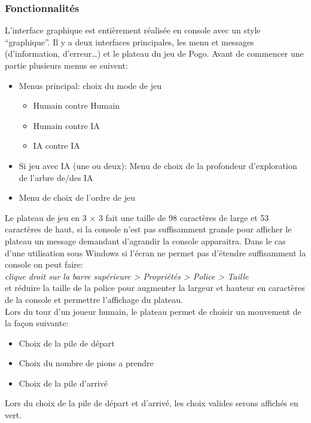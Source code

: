 \documentclass[article, backcover, french, nodocumentinfo]{upmethodology-document}
\begin{document}
			\subsubsection{Fonctionnalités}
				L'interface graphique est entièrement réalisée en console avec un style ``graphique''. Il y a deux interfaces principales, les menu et messages (d'information, d'erreur\ldots) et le plateau du jeu de Pogo.
					Avant de commencer une partie plusieurs menus se suivent:
					\begin{itemize}
						\item Menus principal: choix du mode de jeu
							\begin{itemize}
								\item Humain contre Humain
								\item Humain contre IA
								\item IA contre IA
							\end{itemize}
						\item Si jeu avec IA (une ou deux): Menu de choix de la profondeur d'exploration de l'arbre de/des IA
						\item Menu de choix de l'ordre de jeu
					\end{itemize}
					Le plateau de jeu en 3 $\times$ 3 fait une taille de 98 caractères de large et 53 caractères de haut, si la console n'est pas suffisamment grande pour afficher le plateau un message demandant d'agrandir la console apparaitra. Dans le cas d'une utilisation sous Windows si l'écran ne permet pas d'étendre suffisamment la console on peut faire:\\
					\textit{clique droit sur la barre supérieure > Propriétés > Police > Taille}\\
					et réduire la taille de la police pour augmenter la largeur et hauteur en caractères de la console et permettre l'affichage du plateau.\\

					Lors du tour d'un joueur humain, le plateau permet de choisir un mouvement de la façon suivante:
					\begin{itemize}
						\item Choix de la pile de départ
						\item Choix du nombre de pions a prendre
						\item Choix de la pile d'arrivé
					\end{itemize}
					Lors du choix de la pile de départ et d'arrivé, les choix valides serons affichés en vert.
\end{document}

